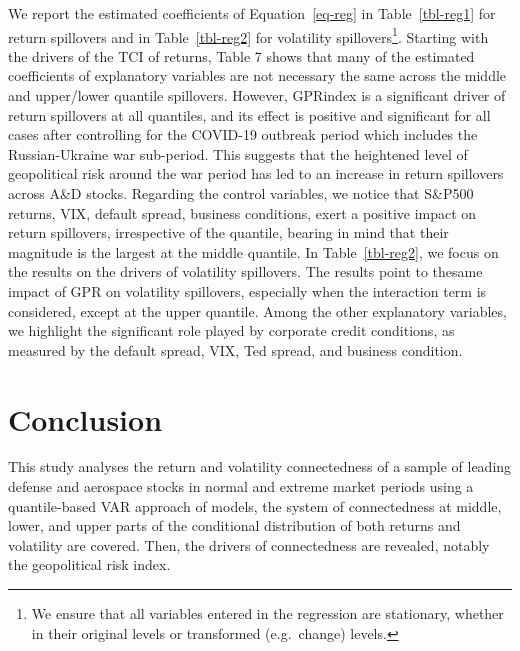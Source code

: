 \documentclass[
  number]{elsarticle}
\begin{document}
We report the estimated coefficients of Equation~\ref{eq-reg} in
Table~\ref{tbl-reg1} for return spillovers and in Table~\ref{tbl-reg2}
for volatility spillovers\footnote{We ensure that all variables entered
  in the regression are stationary, whether in their original levels or
  transformed (e.g.~change) levels.}. Starting with the drivers of the
TCI of returns, Table 7 shows that many of the estimated coefficients of
explanatory variables are not necessary the same across the middle and
upper/lower quantile spillovers. However, GPRindex is a significant
driver of return spillovers at all quantiles, and its effect is positive
and significant for all cases after controlling for the COVID-19
outbreak period which includes the Russian-Ukraine war sub-period. This
suggests that the heightened level of geopolitical risk around the war
period has led to an increase in return spillovers across A\&D stocks.
Regarding the control variables, we notice that S\&P500 returns, VIX,
default spread, business conditions, exert a positive impact on return
spillovers, irrespective of the quantile, bearing in mind that their
magnitude is the largest at the middle quantile. In
Table~\ref{tbl-reg2}, we focus on the results on the drivers of
volatility spillovers. The results point to thesame impact of GPR on
volatility spillovers, especially when the interaction term is
considered, except at the upper quantile. Among the other explanatory
variables, we highlight the significant role played by corporate credit
conditions, as measured by the default spread, VIX, Ted spread, and
business condition.

\hypertarget{conclusion}{%
\section{Conclusion}\label{conclusion}}

This study analyses the return and volatility connectedness of a sample
of leading defense and aerospace stocks in normal and extreme market
periods using a quantile-based VAR approach of models, the system of
connectedness at middle, lower, and upper parts of the conditional
distribution of both returns and volatility are covered. Then, the
drivers of connectedness are revealed, notably the geopolitical risk
index.
\end{document}
